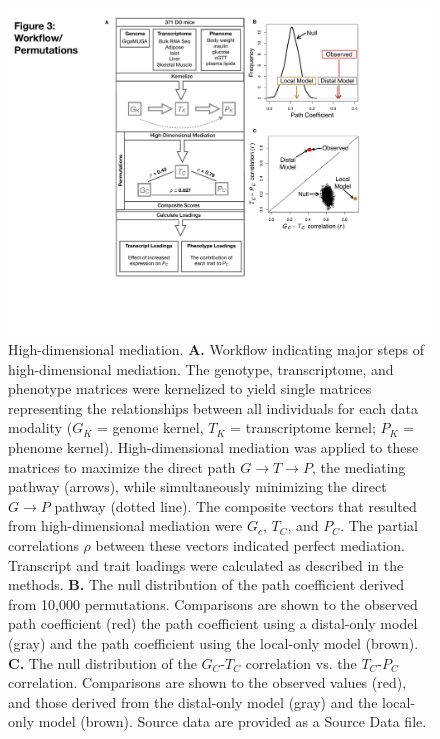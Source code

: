 \documentclass[
]{article}
\begin{document}
\begin{figure}[ht!]
\includegraphics[width=5in]{Figures/Fig3_workflow.pdf} 
\caption{High-dimensional mediation. \textbf{A.} Workflow 
indicating major steps of high-dimensional mediation. The 
genotype, transcriptome, and phenotype matrices were 
kernelized to yield single matrices representing the 
relationships between all individuals for each data modality 
($G_K$ = genome kernel, $T_K$ = transcriptome kernel; 
$P_K$ = phenome kernel). High-dimensional mediation 
was applied to these matrices to maximize the direct path 
$G \rightarrow T \rightarrow P$, the mediating pathway 
(arrows), while simultaneously minimizing the direct $G 
\rightarrow P$ pathway (dotted line). The composite 
vectors that resulted from high-dimensional mediation 
were $G_c$, $T_C$, and $P_C$. The partial correlations 
$\rho$ between these vectors indicated perfect mediation. 
Transcript and trait loadings were calculated as described 
in the methods. \textbf{B.} The null distribution of the path 
coefficient derived from 10,000 permutations. Comparisons 
are shown to the observed path coefficient (red) the path 
coefficient using a distal-only model (gray) and the path 
coefficient using the local-only model (brown). \textbf{C.} 
The null distribution of the $G_C$-$T_C$ correlation vs. 
the $T_C$-$P_C$ correlation. Comparisons are shown 
to the observed values (red), and those derived from the 
distal-only model (gray) and the local-only model (brown).
Source data are provided as a Source Data file.
}
\label{fig:workflow}
\end{figure}
\end{document}
